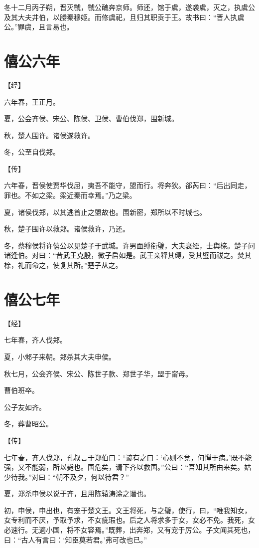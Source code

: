 \documentclass[a4paper,12pt,UTF8,twoside]{ctexbook}
\begin{document}
冬十二月丙子朔，晋灭虢，虢公醜奔京师。师还，馆于虞，遂袭虞，灭之，执虞公及其大夫井伯，以媵秦穆姬。而修虞祀，且归其职贡于王。故书曰：“晋人执虞公。”罪虞，且言易也。


\chapter{僖公六年}



【经】

六年春，王正月。

夏，公会齐侯、宋公、陈侯、卫侯、曹伯伐郑，围新城。

秋，楚人围许。诸侯遂救许。

冬，公至自伐郑。

【传】

六年春，晋侯使贾华伐屈，夷吾不能守，盟而行。将奔狄。郤芮曰：“后出同走，罪也。不如之梁。梁近秦而幸焉。”乃之梁。

夏，诸侯伐郑，以其逃首止之盟故也。围新密，郑所以不时城也。

秋，楚子围许以救郑。诸侯救许，乃还。

冬，蔡穆侯将许僖公以见楚子于武城。许男面缚衔璧，大夫衰绖，士舆榇。楚子问诸逢伯。对曰：“昔武王克殷，微子启如是。武王亲释其缚，受其璧而祓之。焚其榇，礼而命之，使复其所。”楚子从之。


\chapter{僖公七年}



【经】

七年春，齐人伐郑。

夏，小邾子来朝。郑杀其大夫申侯。

秋七月，公会齐侯、宋公、陈世子款、郑世子华，盟于甯母。

曹伯班卒。

公子友如齐。

冬，葬曹昭公。

【传】

七年春，齐人伐郑，孔叔言于郑伯曰：“谚有之曰：‘心则不竞，何惮于病。’既不能强，又不能弱，所以毙也。国危矣，请下齐以救国。”公曰：“吾知其所由来矣。姑少待我。”对曰：“朝不及夕，何以待君？”

夏，郑杀申侯以说于齐，且用陈辕涛涂之谮也。

初，申侯，申出也，有宠于楚文王。文王将死，与之璧，使行，曰，“唯我知女，女专利而不厌，予取予求，不女疵瑕也。后之人将求多于女，女必不免。我死，女必速行。无適小国，将不女容焉。”既葬，出奔郑，又有宠于厉公。子文闻其死也，曰：“古人有言曰：‘知臣莫若君。’弗可改也已。”
\end{document}
